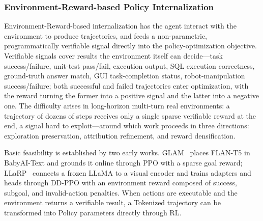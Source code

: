 \subsubsection{Environment-Reward-based Policy Internalization}

Environment-Reward-based internalization has the agent interact with the environment to produce trajectories, and feeds a non-parametric, programmatically verifiable signal directly into the policy-optimization objective. Verifiable signals cover results the environment itself can decide---task success/failure, unit-test pass/fail, execution output, SQL execution correctness, ground-truth answer match, GUI task-completion status, robot-manipulation success/failure; both successful and failed trajectories enter optimization, with the reward turning the former into a positive signal and the latter into a negative one. The difficulty arises in long-horizon multi-turn real environments: a trajectory of dozens of steps receives only a single sparse verifiable reward at the end, a signal hard to exploit---around which work proceeds in three directions: exploration preservation, attribution refinement, and reward densification.

Basic feasibility is established by two early works. GLAM~\cite{Car23} places FLAN-T5 in BabyAI-Text and grounds it online through PPO with a sparse goal reward; LLaRP~\cite{Szo23} connects a frozen LLaMA to a visual encoder and trains adapters and heads through DD-PPO with an environment reward composed of success, subgoal, and invalid-action penalties. When actions are executable and the environment returns a verifiable result, a Tokenized trajectory can be transformed into Policy parameters directly through RL.

